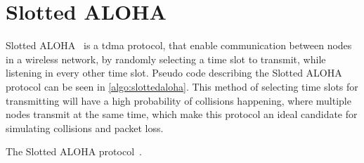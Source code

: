 
\section{Slotted ALOHA}\label{sec:saloha}
Slotted ALOHA~\cite{Roberts:1975:APS:1024916.1024920} is a \gls{tdma} protocol, that enable communication between nodes in a wireless network, by randomly selecting a time slot to transmit, while listening in every other time slot. Pseudo code describing the Slotted ALOHA protocol can be seen in \autoref{algo:slottedaloha}. This method of selecting time slots for transmitting will have a high probability of collisions happening, where multiple nodes transmit at the same time, which make this protocol an ideal candidate for simulating collisions and packet loss.\medbreak

\begin{algorithm}[ht]
    \DontPrintSemicolon


    \caption{The Slotted ALOHA protocol~\cite{Roberts:1975:APS:1024916.1024920}.}
    \label{algo:slottedaloha}
\end{algorithm}




